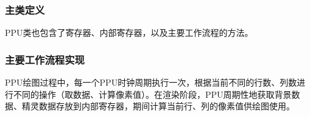 \documentclass[a4paper]{ltxdoc}
\begin{document}
{\subsubsection{主类定义}
PPU类也包含了寄存器、内部寄存器，以及主要工作流程的方法。
\subsubsection{主要工作流程实现}
PPU绘图过程中，每一个PPU时钟周期执行一次，根据当前不同的行数、列数进行不同的操作（取数据、计算像素值）。在渲染阶段，PPU周期性地获取背景数据、精灵数据存放到内部寄存器，期间计算当前行、列的像素值供绘图使用。

}
\end{document}
